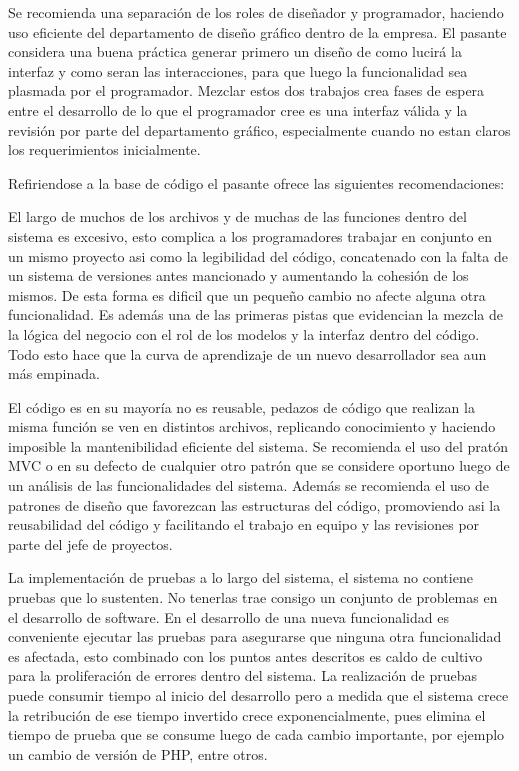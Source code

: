 Se recomienda una separación de los roles de diseñador y programador, haciendo uso eficiente del departamento de diseño gráfico dentro de la empresa. El pasante considera una buena práctica generar primero un diseño de como lucirá la interfaz y como seran las interacciones, para que luego la funcionalidad sea plasmada por el programador. Mezclar estos dos trabajos crea fases de espera entre el desarrollo de lo que el programador cree es una interfaz válida y la revisión por parte del departamento gráfico, especialmente cuando no estan claros los requerimientos inicialmente.

Refiriendose a la base de código el pasante ofrece las siguientes recomendaciones:

El largo de muchos de los archivos y de muchas de las funciones dentro del sistema es excesivo, esto complica a los programadores trabajar en conjunto en un mismo proyecto asi como la legibilidad del código, concatenado con la falta de un sistema de versiones antes mancionado y aumentando la cohesión de los mismos. De esta forma es dificil que un pequeño cambio no afecte alguna otra funcionalidad. Es además una de las primeras pistas que evidencian la mezcla de la lógica del negocio con el rol de los modelos y la interfaz dentro del código. Todo esto hace que la curva de aprendizaje de un nuevo desarrollador sea aun más empinada.

El código es en su mayoría no es reusable, pedazos de código que realizan la misma función se ven en distintos archivos, replicando conocimiento y haciendo imposible la mantenibilidad eficiente del sistema. Se recomienda el uso del pratón MVC o en su defecto de cualquier otro patrón que se considere oportuno luego de un análisis de las funcionalidades del sistema. Además se recomienda el uso de patrones de diseño que favorezcan las estructuras del código, promoviendo asi la reusabilidad del código y facilitando el trabajo en equipo y las revisiones por parte del jefe de proyectos.

La implementación de pruebas a lo largo del sistema, el sistema no contiene pruebas que lo sustenten. No tenerlas trae consigo un conjunto de problemas en el desarrollo de software. En el desarrollo de una nueva funcionalidad es conveniente ejecutar las pruebas para asegurarse que ninguna otra funcionalidad es afectada, esto combinado con los puntos antes descritos es caldo de cultivo para la proliferación de errores dentro del sistema. La realización de pruebas puede consumir tiempo al inicio del desarrollo pero a medida que el sistema crece la retribución de ese tiempo invertido crece exponencialmente, pues elimina el tiempo de prueba que se consume luego de cada cambio importante, por ejemplo un cambio de versión de PHP, entre otros.

